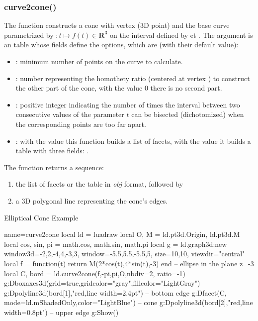 \subsubsection{curve2cone()}
The function  constructs a cone with vertex  (3D point) and the base curve parametrized by $\colon t\mapsto f(t)\in\mathbf R^3$ on the interval defined by  et . The argument  is an table whose fields define the options, which are (with their default value):
\begin{itemize}
    \item {}: minimum number of points on the curve to calculate.
    
    \item {}: number representing the homothety ratio (centered at vertex ) to construct the other part of the cone, with the value $0$ there is no second part.
     
    \item {}: positive integer indicating the number of times the interval between two consecutive values ​​of the parameter $t$ can be bisected (dichotomized) when the corresponding points are too far apart.
    
    \item {} : with the value \false this function builds a list of facets, with the value \true it builds a table with three fields: .
\end{itemize}
The function returns a sequence:
\begin{enumerate}
    \item the list of facets or the table in \emph{obj} format, followed by
    \item a 3D polygonal line representing the cone's edges.
\end{enumerate}

\begin{demo}{Elliptical Cone Example}
\begin{luadraw}{name=curve2cone}
local ld = luadraw
local O, M = ld.pt3d.Origin, ld.pt3d.M
local cos, sin, pi = math.cos, math.sin, math.pi
local g = ld.graph3d:new{ window3d={-2,2,-4,4,-3,3}, window={-5.5,5.5,-5.5,5},
    size={10,10}, viewdir="central"}
local f = function(t) return M(2*cos(t),4*sin(t),-3) end -- ellipse in the plane z=-3
local C, bord = ld.curve2cone(f,-pi,pi,O,{nbdiv=2, ratio=-1})
g:Dboxaxes3d({grid=true,gridcolor="gray",fillcolor="LightGray"})
g:Dpolyline3d(bord[1],"red,line width=2.4pt") -- bottom edge
g:Dfacet(C, {mode=ld.mShadedOnly,color="LightBlue"}) -- cone
g:Dpolyline3d(bord[2],"red,line width=0.8pt") -- upper edge
g:Show()
\end{luadraw}
\end{demo}

